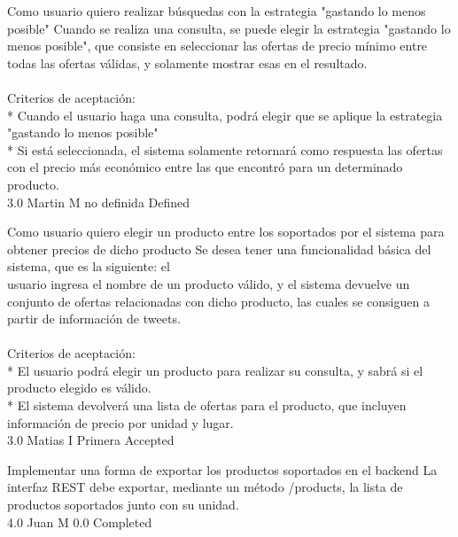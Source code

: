 	{Como usuario quiero realizar búsquedas con la estrategia "gastando lo menos posible"} %
	{Cuando se realiza una consulta, se puede elegir la estrategia "gastando lo\\
menos posible", que consiste en seleccionar las ofertas de precio mínimo entre\\
todas las ofertas válidas, y solamente mostrar esas en el resultado.\\
  \\
Criterios de aceptación:\\
* Cuando el usuario haga una consulta, podrá elegir que se aplique la estrategia "gastando lo menos posible"  \\
* Si está seleccionada, el sistema solamente retornará como respuesta las ofertas con el precio más económico entre las que encontró para un determinado producto.\\
} %
	{} %
	{3.0} %
	{Martin M} %
	{no definida} %
	{Defined} %


\vspace{20pt}

	{Como usuario quiero elegir un producto entre los soportados por el sistema para obtener precios de dicho producto} %
	{Se desea tener una funcionalidad básica del sistema, que es la siguiente: el\\
usuario ingresa el nombre de un producto válido, y el sistema devuelve un\\
conjunto de ofertas relacionadas con dicho producto, las cuales se consiguen a\\
partir de información de tweets.\\
  \\
Criterios de aceptación:\\
* El usuario podrá elegir un producto para realizar su consulta, y sabrá si el producto elegido es válido.  \\
* El sistema devolverá una lista de ofertas para el producto, que incluyen información de precio por unidad y lugar.\\
} %
	{} %
	{3.0} %
	{Matias I} %
	{Primera} %
	{Accepted} %

		{Implementar una forma de exportar los productos soportados en el backend} %
		{La interfaz REST debe exportar, mediante un método /products, la lista de\\
productos soportados junto con su unidad.\\
} %
		{4.0} %
		{Juan M} %
		{0.0} %
		{Completed} %

